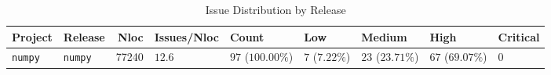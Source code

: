 \begin{table}
\caption{Issue Distribution by Release}
\label{tab:issue-release-distribution}
\begin{tabular}{llrllllll}
\toprule
Project & Release & Nloc & Issues/Nloc & Count & Low & Medium & High & Critical \\
\midrule
\texttt{numpy} & \texttt{numpy} & 77240 & $12.6$ & $97$ ($100.00\%$) & $7$ ($7.22\%$) & $23$ ($23.71\%$) & $67$ ($69.07\%$) & $0$ \\
\bottomrule
\end{tabular}
\end{table}
